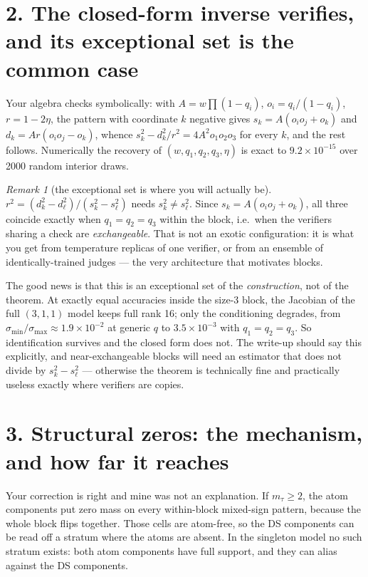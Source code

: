 \documentclass[11pt]{article}
\theoremstyle{remark}
\newtheorem*{remark}{Remark}
\begin{document}
\section*{2. The closed-form inverse verifies, and its exceptional set is the common case}

Your algebra checks symbolically: with $A=w\prod(1-q_i)$, $o_i=q_i/(1-q_i)$, $r=1-2\eta$, the pattern with coordinate $k$ negative gives $s_k=A(o_io_j+o_k)$ and $d_k=Ar(o_io_j-o_k)$, whence $s_k^2-d_k^2/r^2=4A^2o_1o_2o_3$ for every $k$, and the rest follows. Numerically the recovery of $(w,q_1,q_2,q_3,\eta)$ is exact to $9.2\times10^{-15}$ over 2000 random interior draws.

\begin{remark}[the exceptional set is where you will actually be]
$r^2=(d_k^2-d_\ell^2)/(s_k^2-s_\ell^2)$ needs $s_k^2\neq s_\ell^2$. Since $s_k=A(o_io_j+o_k)$, all three coincide exactly when $q_1=q_2=q_3$ within the block, i.e.\ when the verifiers sharing a check are \emph{exchangeable}. That is not an exotic configuration: it is what you get from temperature replicas of one verifier, or from an ensemble of identically-trained judges --- the very architecture that motivates blocks.

The good news is that this is an exceptional set of the \emph{construction}, not of the theorem. At exactly equal accuracies inside the size-3 block, the Jacobian of the full $(3,1,1)$ model keeps full rank 16; only the conditioning degrades, from $\sigma_{\min}/\sigma_{\max}\approx1.9\times10^{-2}$ at generic $q$ to $3.5\times10^{-3}$ with $q_1=q_2=q_3$. So identification survives and the closed form does not. The write-up should say this explicitly, and near-exchangeable blocks will need an estimator that does not divide by $s_k^2-s_\ell^2$ --- otherwise the theorem is technically fine and practically useless exactly where verifiers are copies.
\end{remark}

\section*{3. Structural zeros: the mechanism, and how far it reaches}

Your correction is right and mine was not an explanation. If $m_\tau\ge2$, the atom components put zero mass on every within-block mixed-sign pattern, because the whole block flips together. Those cells are atom-free, so the DS components can be read off a stratum where the atoms are absent. In the singleton model no such stratum exists: both atom components have full support, and they can alias against the DS components.
\end{document}
